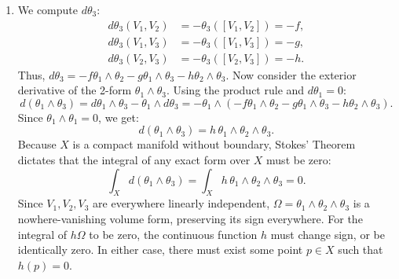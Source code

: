 \documentclass{article}
\begin{document}
\begin{enumerate}[label=\fbox{\arabic*}]
\begin{enumerate}[label=(\arabic*)]
          \item We compute $d\theta_3$:
          \begin{align*}
            d\theta_3(V_1, V_2) &= -\theta_3([V_1, V_2]) = -f, \\
            d\theta_3(V_1, V_3) &= -\theta_3([V_1, V_3]) = -g, \\
            d\theta_3(V_2, V_3) &= -\theta_3([V_2, V_3]) = -h.
          \end{align*}
          Thus, $d\theta_3 = -f \theta_1 \wedge \theta_2 - g \theta_1 \wedge \theta_3 - h \theta_2 \wedge \theta_3$.
          Now consider the exterior derivative of the 2-form $\theta_1 \wedge \theta_3$. Using the product rule and $d\theta_1 = 0$:
          \[
            d(\theta_1 \wedge \theta_3) = d\theta_1 \wedge \theta_3 - \theta_1 \wedge d\theta_3 = -\theta_1 \wedge (-f \theta_1 \wedge \theta_2 - g \theta_1 \wedge \theta_3 - h \theta_2 \wedge \theta_3).
          \]
          Since $\theta_1 \wedge \theta_1 = 0$, we get:
          \[
            d(\theta_1 \wedge \theta_3) = h \, \theta_1 \wedge \theta_2 \wedge \theta_3.
          \]
          Because $X$ is a compact manifold without boundary, Stokes' Theorem dictates that the integral of any exact form over $X$ must be zero:
          \[
            \int_X d(\theta_1 \wedge \theta_3) = \int_X h \, \theta_1 \wedge \theta_2 \wedge \theta_3 = 0.
          \]
          Since $V_1, V_2, V_3$ are everywhere linearly independent, $\Omega = \theta_1 \wedge \theta_2 \wedge \theta_3$ is a nowhere-vanishing volume form, preserving its sign everywhere.
          For the integral of $h \Omega$ to be zero, the continuous function $h$ must change sign, or be identically zero. In either case, there must exist some point $p \in X$ such that $h(p) = 0$.
        \end{enumerate}


\end{enumerate}
\end{document}
